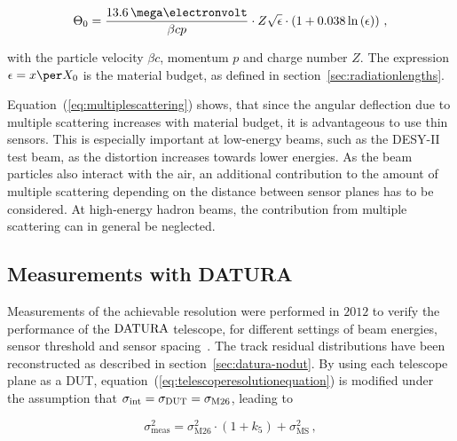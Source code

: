 \begin{equation}
\label{eq:multiplescattering}
\Theta_{0} = \frac{13.6\,\mega\electronvolt}{\beta c p} \cdot Z
\sqrt{\epsilon}
\cdot \left( 1 + 0.038 \ln{\left( \epsilon \right) } \right) \,,
\end{equation}

\noindent with the particle velocity $\beta c$, momentum $p$ and charge number $Z$. 
The expression $\epsilon = x \per X_0$ is the material budget, as defined in section~\ref{sec:radiationlengths}.

Equation~(\ref{eq:multiplescattering}) shows, that since the angular deflection due to multiple scattering increases with material budget, it is advantageous to use thin sensors.
This is especially important at low-energy beams, such as the DESY-II test beam, as the distortion increases towards lower energies.
As the beam particles also interact with the air, an additional contribution to the amount of multiple scattering depending on the distance between sensor planes has to be considered. 
At high-energy hadron beams, the contribution from multiple scattering can in general be neglected.

\subsection{Measurements with DATURA}

Measurements of the achievable resolution were performed in $2012$ to verify the performance of the $\textrm{DATURA}$ telescope, for different settings of beam energies, sensor threshold and sensor spacing~\cite{ref:thomas}.
The track residual distributions have been reconstructed as described in section~\ref{sec:datura-nodut}.
By using each telescope plane as a DUT, equation~(\ref{eq:telescoperesolutionequation}) is modified under the assumption that $\sigma_{\textrm{int}} = \sigma_{\textrm{DUT}} = \sigma_{\textrm{M26}}$,
 leading to

\begin{equation}
\label{eq:telescoperesolutionequation_2}
\sigma_{\textrm{meas}}^2 = \sigma_{\textrm{M26}}^2 \cdot \left( 1 + k_5 \right) +
\sigma_{\textrm{MS}}^2\,,
\end{equation}


